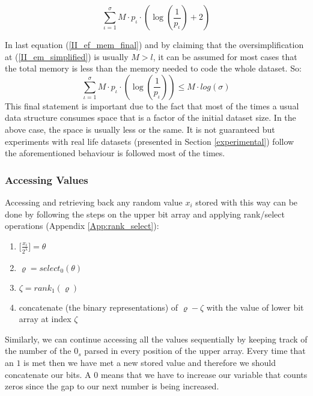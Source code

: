 \begin{equation} \label{II_ef_mem_final}
	\sum_{\iota = 1}^{\sigma} M\cdot p_{\iota}\cdot ( \log(\frac{1}{p_{\iota}}) + 2 )
\end{equation}

In last equation (\ref{II_ef_mem_final}) and by claiming that the oversimplification at (\ref{II_em_simplified}) is usually \(M > l \), it can be assumed for most cases that the total memory is less than the memory needed to code the whole dataset. So:
\begin{equation}
	\sum_{\iota = 1}^{\sigma} M\cdot p_{\iota}\cdot ( \log(\frac{1}{p_{\iota}})) \leq M\cdot log(\sigma)
\end{equation}
This final statement is important due to the fact that most of the times a usual data structure consumes space that is a factor of the initial dataset size. In the above case, the space is usually less or the same. It is not guaranteed but experiments with real life datasets (presented in Section \ref{experimental}) follow the aforementioned behaviour is followed most of the times.
\subsubsection*{Accessing Values}
\par Accessing and retrieving back any random value \(x_i\) stored with this way can be done  by following the steps on the upper bit array and applying rank/select operations (Appendix \ref{App:rank_select}):
\begin{enumerate}
	\item \(\lbrack \frac{x_i}{2^{\lambda}} \rbrack = \theta \)
	\item \(\varrho = select_0(\theta)\)
	\item \(\zeta = rank_1(\varrho)\)
	\item concatenate (the binary representations) of \(\varrho - \zeta\) with the value of lower bit array at index \(\zeta\)
\end{enumerate}
Similarly, we can continue accessing all the values sequentially by keeping track of the number of the $0_s$ parsed in every position of the upper array. Every time that an $1$ is met then we have met a new stored value and therefore we should concatenate our bits. A $0$ means that we have to increase our variable that counts zeros since the gap to our next number is being increased.
